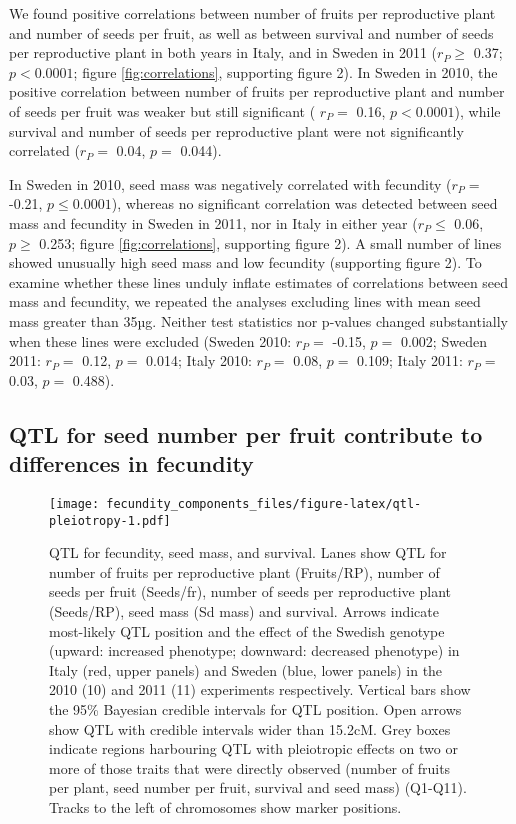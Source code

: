 \documentclass[]{article}
\begin{document}
We found positive correlations between number of fruits per reproductive plant and number of seeds per fruit, as well as between survival and number of seeds per reproductive plant in both years in Italy, and in Sweden in 2011 (\(r_P \geq\)
0.37;
\(p < 0.0001\);
figure \ref{fig:correlations}, supporting figure 2).
In Sweden in 2010, the positive correlation between number of fruits per reproductive plant and number of seeds per fruit was weaker but still significant (
\(r_P=\) 0.16,
\(p<0.0001\)),
while survival and number of seeds per reproductive plant were not significantly correlated
(\(r_P=\) 0.04,
\(p=\) 0.044).

In Sweden in 2010, seed mass was negatively correlated with fecundity
(\(r_P=\) -0.21,
\(p \leq 0.0001\)),
whereas no significant correlation was detected between seed mass and fecundity in Sweden in 2011, nor in Italy in either year
(\(r_P \leq\) 0.06,
\(p \geq\) 0.253;
figure \ref{fig:correlations}, supporting figure 2).
A small number of lines showed unusually high seed mass and low fecundity (supporting figure 2).
To examine whether these lines unduly inflate estimates of correlations between seed mass and fecundity, we repeated the analyses excluding lines with mean seed mass greater than 35µg.
Neither test statistics nor p-values changed substantially when these lines were excluded
(Sweden 2010: \(r_P=\) -0.15, \(p=\) 0.002;
Sweden 2011: \(r_P=\) 0.12, \(p=\) 0.014;
Italy 2010: \(r_P=\) 0.08, \(p=\) 0.109;
Italy 2011: \(r_P=\) 0.03, \(p=\) 0.488).

\hypertarget{qtl-for-seed-number-per-fruit-contribute-to-differences-in-fecundity}{%
\subsection{QTL for seed number per fruit contribute to differences in fecundity}\label{qtl-for-seed-number-per-fruit-contribute-to-differences-in-fecundity}}

\begin{figure}
\centering
\texttt{[image: fecundity\_components\_files/figure-latex/qtl-pleiotropy-1.pdf]}
\caption{\label{fig:qtl-pleiotropy}QTL for fecundity, seed mass, and survival. Lanes show QTL for number of fruits per reproductive plant (Fruits/RP), number of seeds per fruit (Seeds/fr), number of seeds per reproductive plant (Seeds/RP), seed mass (Sd mass) and survival. Arrows indicate most-likely QTL position and the effect of the Swedish genotype (upward: increased phenotype; downward: decreased phenotype) in Italy (red, upper panels) and Sweden (blue, lower panels) in the 2010 (10) and 2011 (11) experiments respectively. Vertical bars show the 95\% Bayesian credible intervals for QTL position. Open arrows show QTL with credible intervals wider than 15.2cM. Grey boxes indicate regions harbouring QTL with pleiotropic effects on two or more of those traits that were directly observed (number of fruits per plant, seed number per fruit, survival and seed mass) (Q1-Q11). Tracks to the left of chromosomes show marker positions.}
\end{figure}
\end{document}
